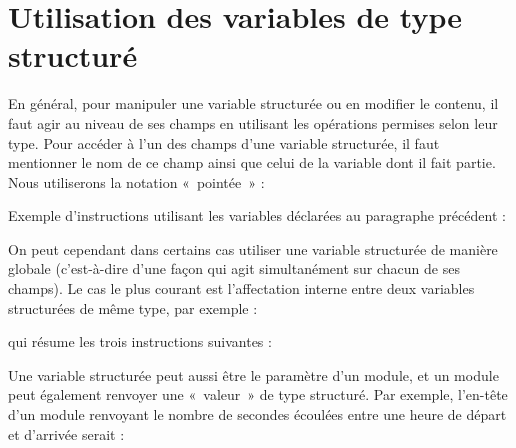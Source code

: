 \section{Utilisation des variables de type structuré}

	En général, pour manipuler une variable
	structurée ou en modifier le contenu, il faut agir au niveau de ses
	champs en utilisant les opérations permises selon leur type. Pour
	accéder à l’un des champs d’une variable structurée, il faut mentionner
	le nom de ce champ ainsi que celui de la variable dont il fait partie.
	Nous utiliserons la notation «~pointée~» :


	Exemple d’instructions utilisant les variables
	déclarées au paragraphe précédent :


	On peut cependant dans certains cas utiliser
	une variable structurée de manière globale (c’est-à-dire d’une façon
	qui agit simultanément sur chacun de ses champs). Le cas le plus
	courant est l’affectation interne entre deux variables structurées de
	même type, par exemple :


	qui résume les trois instructions suivantes :


	Une variable structurée peut aussi être le
	paramètre d’un module, et un module peut également renvoyer une
	«~valeur~» de type structuré. Par exemple, l’en-tête d’un module
	renvoyant le nombre de secondes écoulées entre une heure de départ et
	d’arrivée serait :

